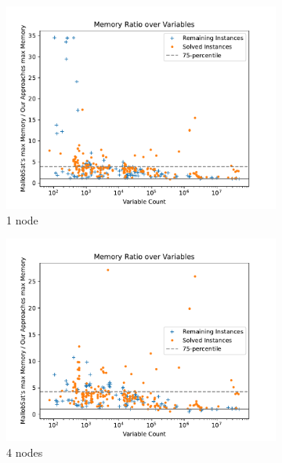 \documentclass[12pt,a4paper,twoside]{scrartcl}
\numberwithin{equation}{section}
\begin{document}
\begin{figure}[!h]
  \center
  \begin{subfigure}[c]{.45\textwidth}
    \center
    \includegraphics[scale=.45]{plots/1node_compare/mem_ratio_over_vars.pdf}
    \caption{1 node}
    \label{fig:memRatiosVars1node}
  \end{subfigure}
  \begin{subfigure}[c]{.45\textwidth}
    \center
    \includegraphics[scale=.45]{plots/4node_compare/mem_ratio_over_vars.pdf}
    \caption{4 nodes}
    \label{fig:memRatiosVars4node}
  \end{subfigure}
  \begin{subfigure}[c]{.45\textwidth}
    \center

\end{subfigure}
\end{figure}
\end{document}
